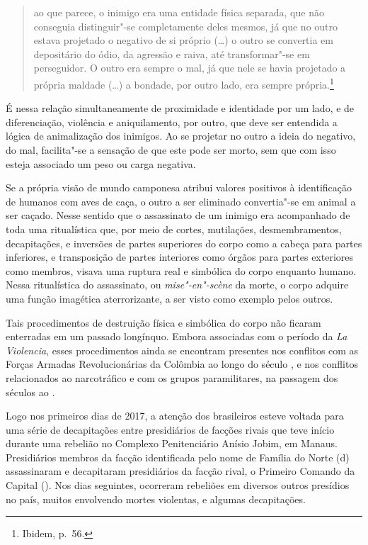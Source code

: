 \begin{quote}
ao que parece, o inimigo era uma entidade física separada, que não
conseguia distinguir"-se completamente deles mesmos, já que no outro
estava projetado o negativo de si próprio (\ldots{}) o outro se convertia em
depositário do ódio, da agressão e raiva, até transformar"-se em
perseguidor. O outro era sempre o mal, já que nele se havia projetado a
própria maldade (\ldots{}) a bondade, por outro lado, era sempre
própria.\footnote{Ibidem, p.~56.}
\end{quote}

É nessa relação simultaneamente de proximidade e identidade por um lado,
e de diferenciação, violência e aniquilamento, por outro, que deve ser
entendida a lógica de animalização dos inimigos. Ao se projetar no outro
a ideia do negativo, do mal, facilita"-se a sensação de que este pode ser
morto, sem que com isso esteja associado um peso ou carga negativa.

Se a própria visão de mundo camponesa atribui valores positivos à
identificação de humanos com aves de caça, o outro a ser eliminado
convertia"-se em animal a ser caçado. Nesse sentido que o assassinato de
um inimigo era acompanhado de toda uma ritualística que, por meio de
cortes, mutilações, desmembramentos, decapitações, e inversões de partes
superiores do corpo como a cabeça para partes inferiores, e transposição
de partes interiores como órgãos para partes exteriores como membros,
visava uma ruptura real e simbólica do corpo enquanto humano. Nessa
ritualística do assassinato, ou \emph{mise"-en"-scène} da morte, o corpo adquire uma função imagética aterrorizante, a ser visto como exemplo pelos outros.

Tais procedimentos de destruição física e simbólica do corpo não
ficaram enterradas em um passado longínquo. Embora associadas com o
período da \emph{La Violencia}, esses procedimentos ainda se encontram
presentes nos conflitos com as Forças Armadas Revolucionárias da
Colômbia ao longo do século , e nos conflitos relacionados ao
narcotráfico e com os grupos paramilitares, na passagem dos séculos 
ao .

\asterisc

Logo nos primeiros dias de 2017, a atenção dos brasileiros esteve
voltada para uma série de decapitações entre presidiários de facções
rivais que teve início durante uma rebelião no Complexo Penitenciário
Anísio Jobim, em Manaus. Presidiários membros da facção identificada
pelo nome de Família do Norte (d) assassinaram e decapitaram
presidiários da facção rival, o Primeiro Comando da Capital (). Nos
dias seguintes, ocorreram rebeliões em diversos outros presídios no
país, muitos envolvendo mortes violentas, e algumas decapitações.

